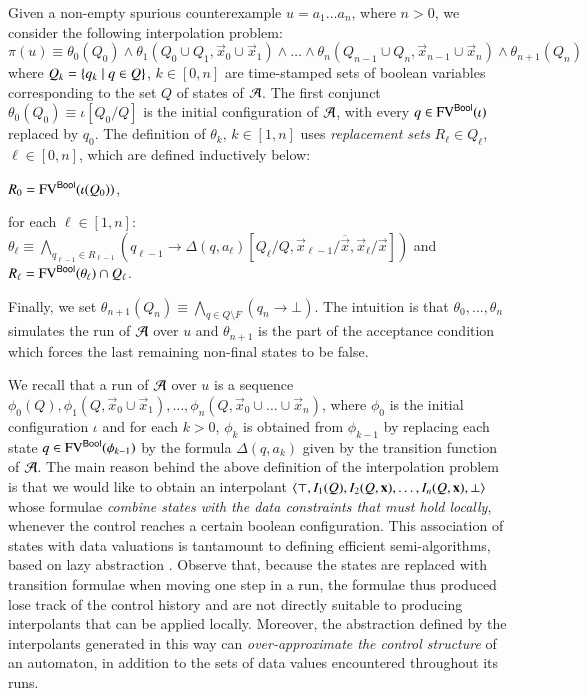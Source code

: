 \documentclass{llncs}
\begin{document}
Given a non-empty spurious counterexample $u = a_1\ldots a_n$, where
$n>0$, we consider the following interpolation problem: \[\pi(u)
\equiv \theta_0(Q_0) \wedge \theta_1(Q_0 \cup Q_1,\vec{x}_0 \cup
\vec{x}_1) \wedge \ldots \wedge \theta_n(Q_{n-1} \cup
Q_n,\vec{x}_{n-1} \cup \vec{x}_n) \wedge \theta_{n+1}(Q_n)\] where
$Q_k = \left\{ q_k \mid q \in Q \right\}$, $k \in [0,n]$ are time-stamped sets of
boolean variables corresponding to the set $Q$ of states of $\mathcal{A}$. The
first conjunct $\theta_0(Q_0) \equiv \iota[Q_0/Q]$ is the initial
configuration of $\mathcal{A}$, with every $q \in \mathrm{FV}^{\mathsf{Bool}}(\iota)$ replaced
by $q_0$. The definition of $\theta_k$, $k\in[1,n]$ uses
\emph{replacement sets} $R_\ell \in Q_\ell$, $\ell\in [0,n]$, which
are defined inductively below: \begin{compactitem}
\item $R_0 = \mathrm{FV}^{\mathsf{Bool}}(\iota(Q_0))$, 
%
\item for each $\ell\in[1,n]$: $\theta_\ell \equiv
  \bigwedge_{q_{\ell-1}\in R_{\ell-1}} (q_{\ell-1} \rightarrow
  \Delta(q,a_\ell)[Q_\ell/Q,\vec{x}_{\ell-1}/\overline{\vec{x}},\vec{x}_\ell/\vec{x}])$
  and $R_\ell = \mathrm{FV}^{\mathsf{Bool}}(\theta_\ell) \cap Q_\ell$.
\end{compactitem}
Finally, we set $\theta_{n+1}(Q_n) \equiv \bigwedge_{q \in Q \setminus
  F} (q_n \rightarrow \bot)$. The intuition is that $\theta_0, \ldots,
\theta_n$ simulates the run of $\mathcal{A}$ over $u$ and $\theta_{n+1}$ is the
part of the acceptance condition which forces the last remaining
non-final states to be false. 

We recall that a run of $\mathcal{A}$ over $u$ is a sequence $\phi_0(Q),
\phi_1(Q,\vec{x}_0\cup\vec{x}_1), \ldots,
\phi_n(Q,\vec{x}_0\cup\ldots\cup\vec{x}_n)$, where $\phi_0$ is the
initial configuration $\iota$ and for each $k>0$, $\phi_k$ is obtained
from $\phi_{k-1}$ by replacing each state $q \in
\mathrm{FV}^{\mathsf{Bool}}(\phi_{k-1})$ by the formula $\Delta(q,a_k)$ given by the
transition function of $\mathcal{A}$. The main reason behind the above
definition of the interpolation problem is that we would like to
obtain an interpolant $\left\langle \top,I_1(Q), I_2(Q,\mathbf x), \ldots,
  I_{n}(Q,\mathbf x),\bot \right\rangle$ whose formulae \emph{combine states with
  the data constraints that must hold locally}, whenever the control
reaches a certain boolean configuration. This association of states
with data valuations is tantamount to defining efficient
semi-algorithms, based on lazy abstraction \cite{HJMS02}. Observe
that, because the states are replaced with transition formulae when
moving one step in a run, the formulae thus produced lose track of the
control history and are not directly suitable to producing
interpolants that can be applied locally. Moreover, the abstraction
defined by the interpolants generated in this way can
\emph{over-approximate the control structure} of an automaton, in
addition to the sets of data values encountered throughout its runs.
\end{document}
